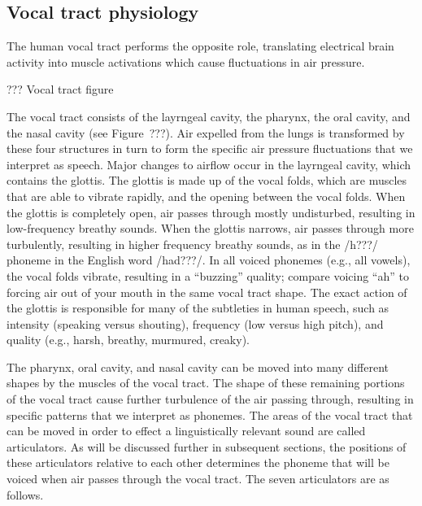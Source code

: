 \subsection{Vocal tract physiology}

The human vocal tract performs
the opposite role,
translating electrical brain activity
into muscle activations
which cause fluctuations in air pressure.

??? Vocal tract figure

The vocal tract consists of
the layrngeal cavity,
the pharynx, the oral cavity,
and the nasal cavity
(see Figure~???).
Air expelled from the lungs
is transformed
by these four structures
in turn to form the
specific air pressure fluctuations
that we interpret as speech.
Major changes to airflow
occur in the layrngeal cavity,
which contains the glottis.
The glottis is made up of
the vocal folds,
which are muscles that are able to vibrate rapidly,
and the opening between the vocal folds.
When the glottis is completely open,
air passes through mostly undisturbed,
resulting in low-frequency breathy sounds.
When the glottis narrows,
air passes through more turbulently,
resulting in higher frequency breathy sounds,
as in the /h???/ phoneme
in the English word /had???/.
In all voiced phonemes (e.g., all vowels),
the vocal folds vibrate,
resulting in a ``buzzing'' quality;
compare voicing ``ah'' to
forcing air out of your mouth
in the same vocal tract shape.
The exact action of the glottis
is responsible for many
of the subtleties in human speech,
such as intensity (speaking versus shouting),
frequency (low versus high pitch),
and quality (e.g., harsh, breathy, murmured, creaky).

The pharynx, oral cavity, and nasal cavity
can be moved into many different shapes
by the muscles of the vocal tract.
The shape of these remaining portions
of the vocal tract cause further turbulence
of the air passing through,
resulting in specific patterns
that we interpret as phonemes.
The areas of the vocal tract
that can be moved in order to
effect a linguistically relevant sound
are called articulators.
As will be discussed further
in subsequent sections,
the positions of these articulators
relative to each other
determines the phoneme
that will be voiced
when air passes through
the vocal tract.
The seven articulators are
as follows.

